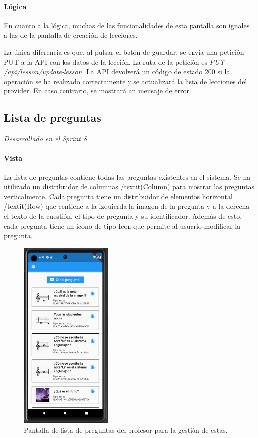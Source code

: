 \paragraph*{Lógica}
En cuanto a la lógica, muchas de las funcionalidades de esta pantalla son iguales a las de la pantalla de creación de lecciones.

La única diferencia es que, al pulsar el botón de guardar, se envía una petición PUT a la API con los datos de la lección. La ruta de la petición es \textit{PUT /api/lesson/update-lesson}. La API devolverá un código de estado 200 si la operación se ha realizado correctamente y se actualizará la lista de lecciones del provider. En caso contrario, se mostrará un mensaje de error.

\newpage
\subsection{Lista de preguntas} 

\textit{Desarrollado en el Sprint 8}

\paragraph*{Vista}
La lista de preguntas contiene todas las preguntas existentes en el sistema. Se ha utilizado un distribuidor de columnas /textit{(Column)} para mostrar las preguntas verticalmente. 
Cada pregunta tiene un distribuidor de elementos horizontal /textit{(Row)} que contiene a la izquierda la imagen de la pregunta y a la derecha el texto de la cuestión, el tipo de pregunta y su identificador. 
Además de esto, cada pregunta tiene un icono de tipo Icon que permite al usuario modificar la pregunta.
\begin{figure}[H]
  \centering
  \includegraphics[width=0.4\textwidth]{imagenes/c7/listapreguntas.png}
  \caption{Pantalla de lista de preguntas del profesor para la gestión de estas.} 
  \label{fig:listapreguntas}
\end{figure}


